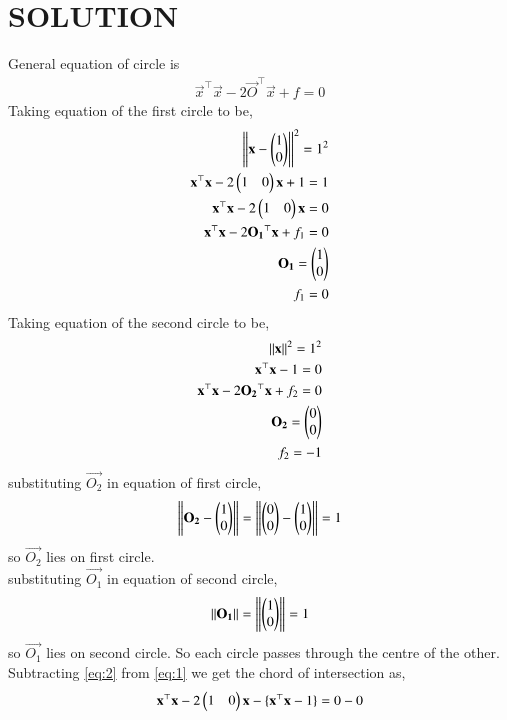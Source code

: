 \documentclass[journal,12pt,twocolumn]{IEEEtran}
\begin{document}
\section*{SOLUTION}
\begin{enumerate}
General equation of circle is
\begin{align}
  \Vec{x}^\top\Vec{x} - 2 \Vec{O}^\top \Vec{x} + f=0
\end{align}
Taking equation of the first circle to be,
\begin{align}
 \norm{\vec{x}-\myvec{1 \\0}} ^2 =1 ^2   \\ 
 \Vec{x}^\top\Vec{x} - 2 \myvec{1&0} \Vec{x} + 1 =1\\
  \Vec{x}^\top\Vec{x} - 2 \myvec{1&0} \Vec{x}  =0 \label{eq:1}\\
\Vec{x}^\top\Vec{x} - 2 \Vec{O_1}^\top \Vec{x} + f_1=0\\
\Vec{O_1}=\myvec{1\\0}\\
f_1=0
\end{align}
Taking equation of the second circle to be,
\begin{align}
 \norm{\vec{x}} ^2 =1 ^2   \\ 
 \Vec{x}^\top\Vec{x} -1=0 \label{eq:2} \\
\Vec{x}^\top\Vec{x} - 2 \Vec{O_2}^\top \Vec{x} + f_2=0\\
\Vec{O_2}=\myvec{0\\0}\\
f_2=-1
\end{align}
substituting $\vec{O_2}$ in equation of first circle,
\begin{align}
     \left\lVert\mathbf{O_2}-\begin{pmatrix}1 \\0\end{pmatrix}\right\rVert=\left\lVert\begin{pmatrix}0\\0\end{pmatrix}-\begin{pmatrix}1 \\0\end{pmatrix}\right\rVert  =1  
\end{align}
so $\vec{O_2}$ lies on first circle.\\
substituting $\vec{O_1}$ in equation of second circle,
\begin{align}
     \left\lVert\mathbf{O_1}\right\rVert=\left\lVert\begin{pmatrix}1 \\0\end{pmatrix}\right\rVert  =1  
\end{align}
so $\vec{O_1}$ lies on second circle.
So each circle passes through the centre of the other.\\
Subtracting \eqref{eq:2} from \eqref{eq:1} we get the chord of intersection as,
\begin{align}
     \Vec{x}^\top\Vec{x} - 2 \myvec{1&0} \Vec{x} -\{\Vec{x}^\top\Vec{x} -1\} =0 -0\\

\end{align}
\end{enumerate}
\end{document}

